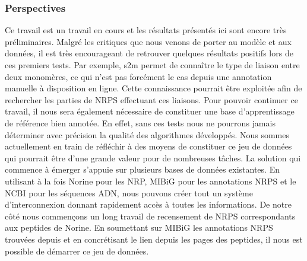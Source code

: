 \subsubsection{Perspectives}

Ce travail est un travail en cours et les résultats présentés ici sont encore très préliminaires.
Malgré les critiques que nous venons de porter au modèle et aux données, il est très encourageant de retrouver quelques résultats positifs lors de ces premiers tests.
Par exemple, s2m permet de connaître le type de liaison entre deux monomères, ce qui n'est pas forcément le cas depuis une annotation manuelle à disposition en ligne.
Cette connaissance pourrait être exploitée afin de rechercher les parties de NRPS effectuant ces liaisons.
Pour pouvoir continuer ce travail, il nous sera également nécessaire de constituer une base d'apprentissage de référence bien annotée.
En effet, sans ces tests nous ne pourrons jamais déterminer avec précision la qualité des algorithmes développés.
Nous sommes actuellement en train de réfléchir à des moyens de constituer ce jeu de données qui pourrait être d'une grande valeur pour de nombreuses tâches.
La solution qui commence à émerger s'appuie sur plusieurs bases de données existantes.
En utilisant à la fois Norine pour les NRP, MIBiG pour les annotations NRPS et le NCBI pour les séquences ADN, nous pouvons créer tout un système d'interconnexion donnant rapidement accès à toutes les informations.
De notre côté nous commençons un long travail de recensement de NRPS correspondants aux peptides de Norine.
En soumettant sur MIBiG les annotations NRPS trouvées depuis et en concrétisant le lien depuis les pages des peptides, il nous est possible de démarrer ce jeu de données.